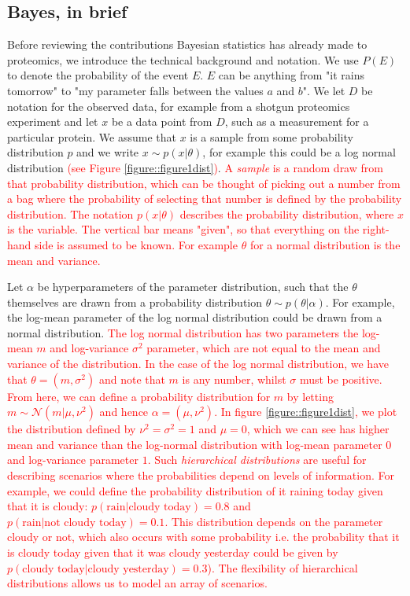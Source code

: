 \documentclass[12pt,english, journal=jpr, layout=twocolumn]{article}
\begin{document}
\subsection{Bayes, in brief}
Before reviewing the contributions Bayesian statistics has already made to proteomics, we introduce the technical background and notation. We use $P(E)$ to denote the probability of the event $E$. $E$ can be anything from "it rains tomorrow" to "my parameter falls between the values $a$ and $b$". We let $D$ be notation for the observed data, for example from a shotgun proteomics experiment and let $x$ be a data point from $D$, such as a measurement for a particular protein. We assume that $x$ is a sample from some probability distribution $p$ and we write $x \sim p(x|\theta)$, for example this could be a log normal distribution \textcolor{red}{(see Figure \ref{figure::figure1dist})}.\textcolor{red}{ A \textit{sample} is a random draw from that probability distribution, which can be thought of picking out a number from a bag where the probability of selecting that number is defined by the probability distribution. The notation $p(x|\theta)$ describes the probability distribution, where $x$ is the variable. The vertical bar means "given", so that everything on the right-hand side is assumed to be known. For example $\theta$ for a normal distribution is the mean and variance. }


 Let $\alpha$ be hyperparameters of the parameter distribution, such that the $\theta$ themselves are drawn from a probability distribution $\theta \sim p(\theta|\alpha)$. For example, the log-mean parameter of the log normal distribution could be drawn from a normal distribution. \textcolor{red}{The log normal distribution has two parameters the log-mean $m$ and log-variance $\sigma^2$ parameter, which are not equal to the mean and variance of the distribution. In the case of the log normal distribution, we have that $\theta = (m, \sigma^2)$ and note that $m$ is any number, whilst $\sigma$ must be positive. From here, we can define a probability distribution for $m$ by letting $m \sim \mathcal{N}(m|\mu,\nu^2)$ and hence $\alpha = (\mu, \nu^2)$. In figure \ref{figure::figure1dist}, we plot the distribution defined by $\nu^2 = \sigma^2 = 1$ and $\mu = 0$, which we can see has higher mean and variance than the log-normal distribution with log-mean parameter $0$ and log-variance parameter $1$. Such \textit{hierarchical distributions} are useful for describing scenarios where the probabilities depend on levels of information. For example, we could define the probability distribution of it raining today given that it is cloudy: $p(\text{rain}|\text{cloudy today}) = 0.8$ and $p(\text{rain}|\text{not cloudy today}) = 0.1$. This distribution depends on the parameter cloudy or not, which also occurs with some probability i.e. the probability that it is cloudy today given that it was cloudy yesterday could be given by $p(\text{cloudy today}| \text{cloudy yesterday}) = 0.3$). The flexibility of hierarchical distributions allows us to model an array of scenarios.}  
\end{document}

